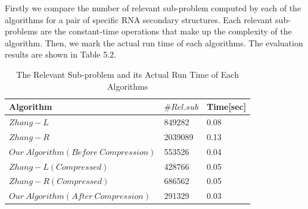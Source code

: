 Firstly we compare the number of relevant sub-problem computed by each of the algorithms for a pair of specific RNA secondary structures. Each relevant sub-problems are the constant-time operations that make up the complexity of the algorithm. Then, we mark the actual run time of each algorithms. The evaluation results are shown in Table 5.2.

\begin{table}
			\centering
			\begin{tabular}{l l l}
				\toprule
				\textbf{Algorithm} & \textbf{$\#Rel.sub$} &\textbf{Time[sec]}\\
				\midrule
				$Zhang-L$ & 849282 & 0.08\\
				$Zhang-R$ & 2039089 & 0.13\\
				$Our\ Algorithm(Before\ Compression)$ & 553526 & 0.04\\
				$Zhang-L(Compressed)$ & 428766 & 0.05\\
				$Zhang-R(Compressed)$ & 686562 & 0.05\\
				$Our\ Algorithm(After\ Compression)$ & 291329 & 0.03\\
			\end{tabular}
		\caption{The Relevant Sub-problem and its Actual Run Time of Each Algorithms}
\end{table}



